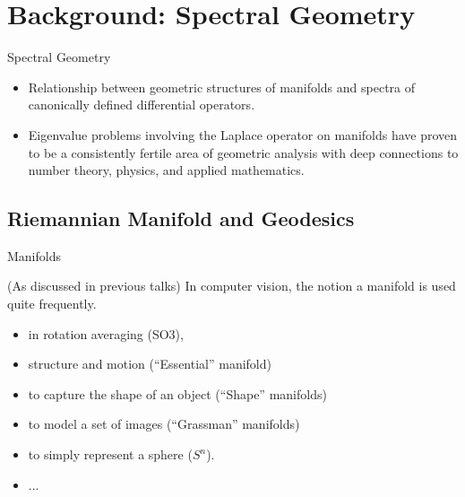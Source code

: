 \documentclass{beamer}
\begin{document}
\section{Background: Spectral Geometry}


\begin{frame}{Spectral Geometry}

\begin{itemize}
  \item Relationship between geometric structures of manifolds and spectra of canonically defined differential operators.
  \item Eigenvalue problems involving the Laplace operator on manifolds have proven to be a consistently fertile area of geometric analysis with deep connections to number theory, physics, and applied mathematics. 
\end{itemize}

\end{frame}

\subsection{Riemannian Manifold and Geodesics}

\begin{frame}{Manifolds}

(As discussed in previous talks) In computer vision, the notion a manifold is used quite frequently.

\begin{itemize}
  \item in rotation averaging (SO3),
  \item structure and motion (“Essential” manifold)
  \item to capture the shape of an object (“Shape” manifolds)
  \item to model a set of images (“Grassman” manifolds)
  \item to simply represent a sphere ($S^n$).
  \item ...
\end{itemize}

\end{frame}
\end{document}
